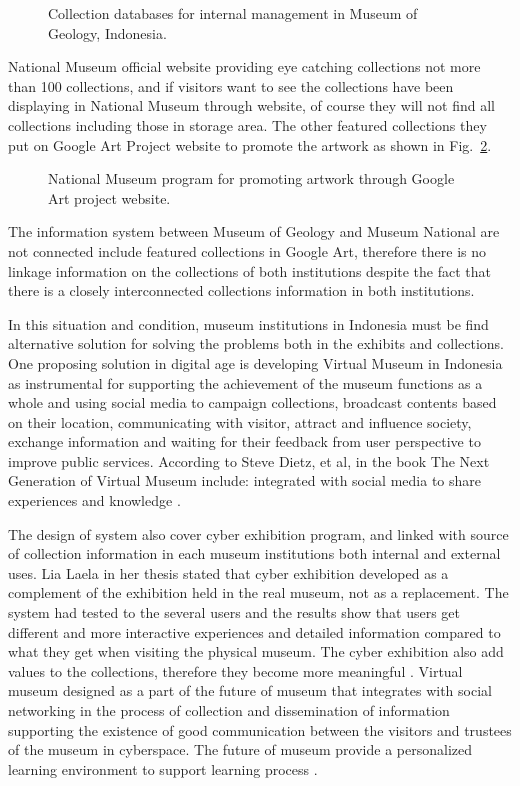 \begin{figure}[ht]
	\caption{Collection databases for internal management in Museum of Geology, Indonesia.}\label{fig:dbMuseumIndonesia}
\end{figure}

National Museum official website providing eye catching collections not more than 100 collections, and if visitors want to see the collections have been displaying in National Museum through website, of course they will not find all collections including those in storage area. The other featured collections they put on Google Art Project website to promote the artwork as shown in Fig.~\cref{fig:museumGoogleArt}.

\begin{figure}[ht]
	\caption{National Museum program for promoting artwork through Google Art project website.}\label{fig:museumGoogleArt}
\end{figure}

The information system between Museum of Geology and Museum National are not connected include featured collections in Google Art, therefore there is no linkage information on the collections of both institutions despite the fact that there is a closely interconnected collections information in both institutions.

In this situation and condition, museum institutions in Indonesia must be find alternative solution for solving the problems both in the exhibits and collections. One proposing solution in digital age is developing Virtual Museum in Indonesia as instrumental for supporting the achievement of the museum functions as a whole and using social media to campaign collections, broadcast contents based on their location, communicating with visitor, attract and influence society, exchange information and waiting for their feedback from user perspective to improve public services. According to Steve Dietz, et al, in the book The Next Generation of Virtual Museum include: integrated with social media to share experiences and knowledge \cite{Dietz}.

The design of system also cover cyber exhibition program, and linked with source of collection information in each museum institutions both internal and external uses. Lia Laela in her thesis stated that cyber exhibition developed as a complement of the exhibition held in the real museum, not as a replacement. The system had tested to the several users and the results show that users get different and more interactive experiences and detailed information compared to what they get when visiting the physical museum. The cyber exhibition also add values to the collections, therefore they become more meaningful \cite{Sarah}. Virtual museum designed as a part of the future of museum that integrates with social networking in the process of collection and dissemination of information supporting the existence of good communication between the visitors and trustees of the museum in cyberspace. The future of museum provide a personalized learning environment to support learning process \cite{Anggai}.

